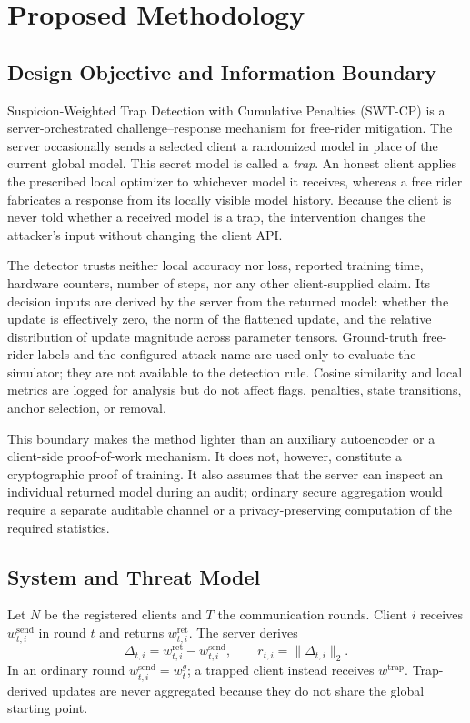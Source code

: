 \chapter{Proposed Methodology}
\label{sec:proposed-methodology}

\section{Design Objective and Information Boundary}

Suspicion-Weighted Trap Detection with Cumulative Penalties (SWT-CP) is a server-orchestrated challenge--response mechanism for free-rider mitigation. The server occasionally sends a selected client a randomized model in place of the current global model. This secret model is called a \emph{trap}. An honest client applies the prescribed local optimizer to whichever model it receives, whereas a free rider fabricates a response from its locally visible model history. Because the client is never told whether a received model is a trap, the intervention changes the attacker's input without changing the client API.

The detector trusts neither local accuracy nor loss, reported training time, hardware counters, number of steps, nor any other client-supplied claim. Its decision inputs are derived by the server from the returned model: whether the update is effectively zero, the norm of the flattened update, and the relative distribution of update magnitude across parameter tensors. Ground-truth free-rider labels and the configured attack name are used only to evaluate the simulator; they are not available to the detection rule. Cosine similarity and local metrics are logged for analysis but do not affect flags, penalties, state transitions, anchor selection, or removal.

This boundary makes the method lighter than an auxiliary autoencoder or a client-side proof-of-work mechanism. It does not, however, constitute a cryptographic proof of training. It also assumes that the server can inspect an individual returned model during an audit; ordinary secure aggregation would require a separate auditable channel or a privacy-preserving computation of the required statistics.

\section{System and Threat Model}

Let $N$ be the registered clients and $T$ the communication rounds. Client $i$ receives $w^{\mathrm{send}}_{t,i}$ in round $t$ and returns $w^{\mathrm{ret}}_{t,i}$. The server derives
\begin{equation}
\Delta_{t,i}=w^{\mathrm{ret}}_{t,i}-w^{\mathrm{send}}_{t,i},
\qquad r_{t,i}=\lVert\Delta_{t,i}\rVert_2.
\end{equation}
In an ordinary round $w^{\mathrm{send}}_{t,i}=w^g_t$; a trapped client instead receives $w^{\mathrm{trap}}$. Trap-derived updates are never aggregated because they do not share the global starting point.

